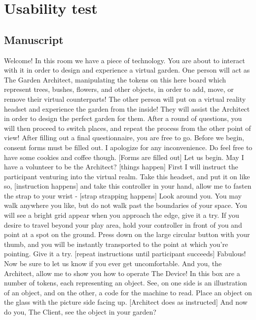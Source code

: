 \section{Usability test}\label{sec:appendixUsability}
	\subsection{Manuscript}\label{sec:appendixUsabilityManuscript}
Welcome!
		In this room we have a piece of technology. You are about to interact with it in order to design and experience a virtual garden. One person will act as The Garden Architect, manipulating the tokens on this here board which represent trees, bushes, flowers, and other objects, in order to add, move, or remove their virtual counterparts! The other person will put on a virtual reality headset and experience the garden from the inside! They will assist the Architect in order to design the perfect garden for them. After a round of questions, you will then proceed to switch places, and repeat the process from the other point of view! After filling out a final questionnaire, you are free to go. 
		Before we begin, consent forms must be filled out. I apologize for any inconvenience. Do feel free to have some cookies and coffee though. 
		[Forms are filled out]
		Let us begin. May I have a volunteer to be the Architect? 
		[things happen]
		First I will instruct the participant venturing into the virtual realm. Take this headset, and put it on like so,
		[instruction happens]
		and take this controller in your hand, allow me to fasten the strap to your wrist -
		[strap strapping happens]
		Look around you. You may walk anywhere you like, but do not walk past the boundaries of your space. You will see a bright grid appear when you approach the edge, give it a try. If you desire to travel beyond your play area, hold your controller in front of you and point at a spot on the ground. Press down on the large circular button with your thumb, and you will be instantly transported to the point at which you’re pointing. Give it a try. 
		[repeat instructions until participant succeeds]
		Fabulous! Now be sure to let us know if you ever get uncomfortable. And you, the Architect, allow me to show you how to operate The Device! In this box are a number of tokens, each representing an object. See, on one side is an illustration of an object, and on the other, a code for the machine to read. Place an object on the glass with the picture side facing up. 
		[Architect does as instructed]
		And now do you, The Client, see the object in your garden?
